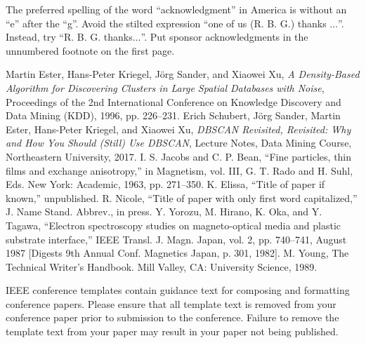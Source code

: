 \documentclass[conference]{IEEEtran}
\begin{document}
The preferred spelling of the word ``acknowledgment'' in America is without 
an ``e'' after the ``g''. Avoid the stilted expression ``one of us (R. B. 
G.) thanks $\ldots$''. Instead, try ``R. B. G. thanks$\ldots$''. Put sponsor 
acknowledgments in the unnumbered footnote on the first page.

\begin{thebibliography}{00}
Martin Ester, Hans-Peter Kriegel, Jörg Sander, and Xiaowei Xu, 
\emph{A Density-Based Algorithm for Discovering Clusters in Large Spatial Databases with Noise}, 
Proceedings of the 2nd International Conference on Knowledge Discovery and Data Mining (KDD), 1996, pp. 226–231.
Erich Schubert, Jörg Sander, Martin Ester, Hans-Peter Kriegel, and Xiaowei Xu, 
\emph{DBSCAN Revisited, Revisited: Why and How You Should (Still) Use DBSCAN}, 
Lecture Notes, Data Mining Course, Northeastern University, 2017. 
 I. S. Jacobs and C. P. Bean, ``Fine particles, thin films and exchange anisotropy,'' in Magnetism, vol. III, G. T. Rado and H. Suhl, Eds. New York: Academic, 1963, pp. 271--350.
 K. Elissa, ``Title of paper if known,'' unpublished.
 R. Nicole, ``Title of paper with only first word capitalized,'' J. Name Stand. Abbrev., in press.
 Y. Yorozu, M. Hirano, K. Oka, and Y. Tagawa, ``Electron spectroscopy studies on magneto-optical media and plastic substrate interface,'' IEEE Transl. J. Magn. Japan, vol. 2, pp. 740--741, August 1987 [Digests 9th Annual Conf. Magnetics Japan, p. 301, 1982].
 M. Young, The Technical Writer's Handbook. Mill Valley, CA: University Science, 1989.
\end{thebibliography}
\vspace{12pt}
\color{red}
IEEE conference templates contain guidance text for composing and formatting conference papers. Please ensure that all template text is removed from your conference paper prior to submission to the conference. Failure to remove the template text from your paper may result in your paper not being published.
\end{document}
